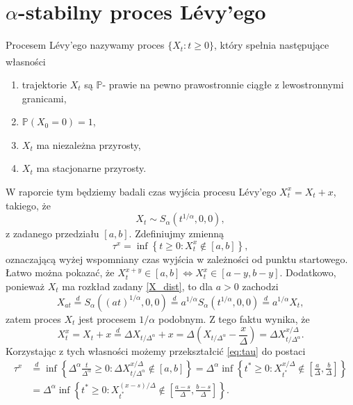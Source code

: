\documentclass[12pt]{mwrep}
\begin{document}
	\section{$\alpha$-stabilny proces L\'evy'ego}
	\noindent Procesem L\'evy'ego nazywamy proces $\{X_t: t\geq 0\}$, który spełnia następujące własności\textsuperscript{\cite{Levy_def}}
	\begin{enumerate}[label=\textbf{(\roman*)}, leftmargin=10mm]
		\item trajektorie $X_t$ są $\mathbb{P}$- prawie na pewno prawostronnie ciągłe z lewostronnymi granicami,
		\item $\mathbb{P}\left(X_0=0\right)=1$,
		\item $X_t$ ma niezależna przyrosty,
		\item $X_t$ ma stacjonarne przyrosty.
	\end{enumerate}
	W raporcie tym będziemy badali czas wyjścia procesu L\'evy'ego $X_t^x=X_t+x$, takiego, że 
	\begin{equation}\label{X_dist}
		X_t\sim S_\alpha(t^{1/\alpha},0,0),
	\end{equation}
	z zadanego przedziału $[a, b]$. Zdefiniujmy zmienną
	\begin{equation}\label{eq:tau}
		\tau^x=\inf\left\{t\geq0: X_t^x\notin[a,b]\right\},
	\end{equation}
	oznaczającą wyżej wspomniany czas wyjścia w zależności od punktu startowego.
	Łatwo można pokazać, że $X^{x+y}_t\in[a ,b] \iff X^x_t\in[a-y, b-y]$. Dodatkowo, ponieważ $X_t$ ma rozkład zadany \eqref{X_dist}, to dla $a>0$ zachodzi
	\begin{equation}
		X_{at} \overset{d}{=} S_\alpha\left(\left(at\right)^{1/\alpha},0,0\right)\overset{d}{=}a^{1/\alpha}S_\alpha\left(t^{1/\alpha},0,0\right)
		\overset{d}{=}a^{1/\alpha}X_t,
	\end{equation}
	zatem proces $X_t$ jest procesem $1/\alpha$ podobnym. Z tego faktu wynika, że
	\begin{equation}
		X^x_t=X_t+x\overset{d}{=}\Delta X_{t/\Delta^{\alpha}}+x = \Delta\left(X_{t/\Delta^{\alpha}}-\frac{x}{\Delta}\right)=\Delta X^{x/\Delta}_{t/\Delta^\alpha}.
	\end{equation}
	 Korzystając z tych własności możemy przekształcić \eqref{eq:tau} do postaci
	\begin{equation}
		\begin{split}
		\tau^x&\overset{d}{=}\inf\left\{\Delta^\alpha\frac{t}{\Delta^\alpha}\geq0:\Delta X^{x/\Delta}_{t/\Delta^\alpha}\notin[a, b]\right\} 	=\Delta^\alpha\inf\left\{t^*\geq0:X^{x/\Delta}_{t^*}\notin\left[\frac{a}{\Delta},\frac{b}{\Delta}\right]\right\}\\
		&=\Delta^\alpha\inf\left\{t^*\geq0:X^{(x-s)/\Delta}_{t^*}\notin\left[\frac{a-s}{\Delta},\frac{b-s}{\Delta}\right]\right\}.
		\end{split}
	\end{equation}
\end{document}

